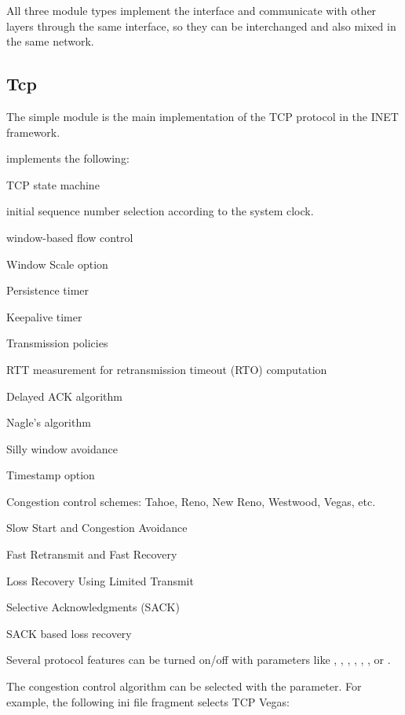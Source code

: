 All three module types implement the  interface and communicate
with other layers through the same interface, so they can be interchanged and
also mixed in the same network.


\subsection{Tcp}
\label{sec:transport:tcp}

The  simple module is the main implementation of the TCP protocol
in the INET framework.

 implements the following:

\begin{compactitem}
  \item TCP state machine
  \item initial sequence number selection according to the system clock.
  \item window-based flow control
  \item Window Scale option
  \item Persistence timer
  \item Keepalive timer
  \item Transmission policies
  \item RTT measurement for retransmission timeout (RTO) computation
  \item Delayed ACK algorithm
  \item Nagle's algorithm
  \item Silly window avoidance
  \item Timestamp option
  \item Congestion control schemes: Tahoe, Reno, New Reno, Westwood, Vegas, etc.
  \item Slow Start and Congestion Avoidance
  \item Fast Retransmit and Fast Recovery
  \item Loss Recovery Using Limited Transmit
  \item Selective Acknowledgments (SACK)
  \item SACK based loss recovery
\end{compactitem}

Several protocol features can be turned on/off with parameters like
, , ,
, , , or
.

The congestion control algorithm can be selected with the 
parameter. For example, the following ini file fragment selects TCP Vegas:

